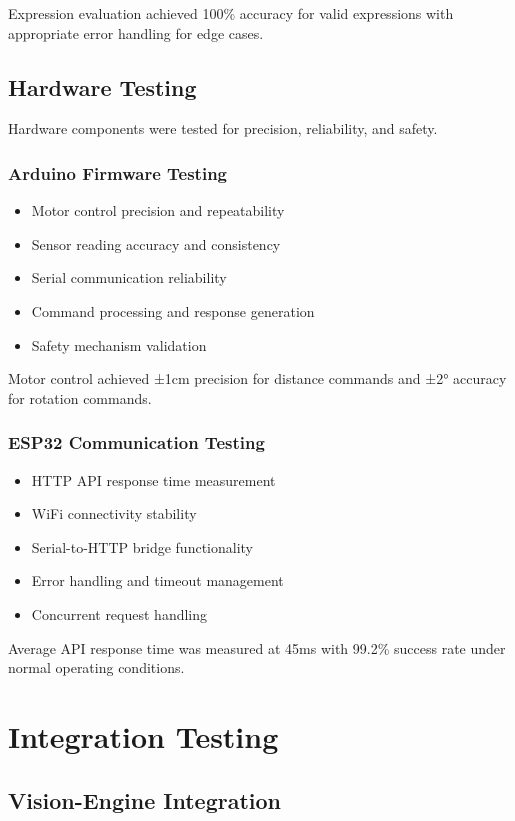 Expression evaluation achieved 100\% accuracy for valid expressions with appropriate error handling for edge cases.

\subsection{Hardware Testing}

Hardware components were tested for precision, reliability, and safety.

\subsubsection{Arduino Firmware Testing}
\begin{itemize}
    \item Motor control precision and repeatability
    \item Sensor reading accuracy and consistency
    \item Serial communication reliability
    \item Command processing and response generation
    \item Safety mechanism validation
\end{itemize}

Motor control achieved ±1cm precision for distance commands and ±2° accuracy for rotation commands.

\subsubsection{ESP32 Communication Testing}
\begin{itemize}
    \item HTTP API response time measurement
    \item WiFi connectivity stability
    \item Serial-to-HTTP bridge functionality
    \item Error handling and timeout management
    \item Concurrent request handling
\end{itemize}

Average API response time was measured at 45ms with 99.2\% success rate under normal operating conditions.

\section{Integration Testing}

\subsection{Vision-Engine Integration}

